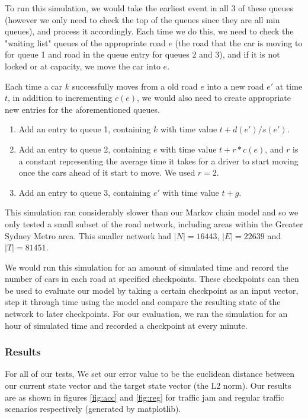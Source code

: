 \documentclass[a4paper]{article}
\begin{document}
To run this simulation, we would take the earliest event in all 3 of these queues (however we only need to check the top of the queues since they are all min queues), and
process it accordingly.
Each time we do this, we need to check the "waiting list" queues of the appropriate road $e$ 
(the road that the car is moving to for queue 1 and road in the queue entry for queues 2 and 3), and if it is not locked or at capacity, we move the car 
into $e$.

Each time a car $k$ successfully moves from a old road $e$ into a new road $e'$ at time $t$, in addition to incrementing $c(e)$, 
we would also need to create appropriate new entries for the aforementioned queues.
\begin{enumerate}
	\item Add an entry to queue 1, containing $k$ with time value $t + d(e')/s(e')$.
	\item Add an entry to queue 2, containing $e$ with time value $t + r * c(e)$, and $r$ 
		is a constant representing the average time it takes for a driver to start
		moving once the cars ahead of it start to move. We used $r = 2$.
	\item Add an entry to queue 3, containing $e'$ with time value $t + g$.
\end{enumerate}

This simulation ran considerably slower than our Markov chain model and so we only tested a small subset of the road network, including areas within the Greater Sydney Metro 
area. This smaller network had $|N| = 16443$, $|E| = 22639$ and $|T| = 81451$.

We would run this simulation for an amount of simulated time and record the number of cars in each road at specified checkpoints.
These checkpoints can then be used to evaluate our model by taking a certain checkpoint as an input vector, step it through time using the model and compare the resulting
state of the network to later checkpoints.
For our evaluation, we ran the simulation for an hour of simulated time and recorded a checkpoint at every minute.


\subsubsection{Results}
For all of our tests, We set our error value to be the euclidean distance between our current state vector and the target state vector (the L2 norm).
Our results are as shown in figures \ref{fig:acc} and \ref{fig:reg} for traffic jam and regular traffic scenarios respectively (generated by matplotlib).
\end{document}
